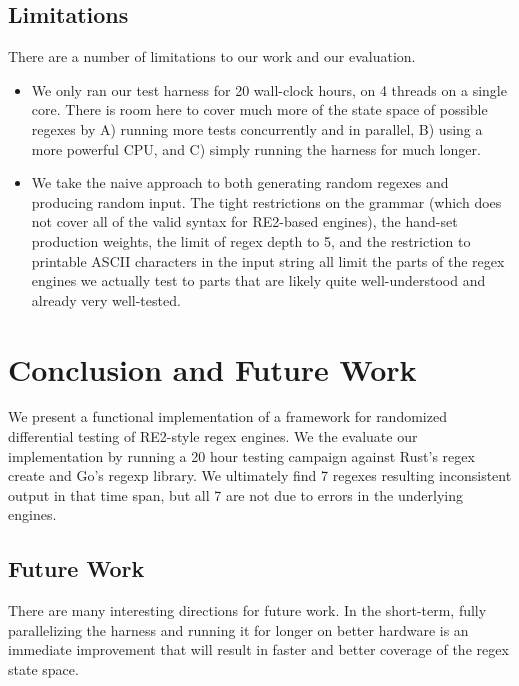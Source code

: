 \documentclass[acmsmall,nonacm,screen]{acmart}
\begin{document}
\subsection{Limitations}
There are a number of limitations to our work and our evaluation.
\begin{itemize}
\item We only ran our test harness for 20 wall-clock hours, on 4 threads on a single core. There is room here to cover much more of the state space of possible regexes by A) running more tests concurrently and in parallel, B) using a more powerful CPU, and C) simply running the harness for much longer.
\item We take the naive approach to both generating random regexes and producing random input. The tight restrictions on the grammar (which does not cover all of the valid syntax for RE2-based engines), the hand-set production weights, the limit of regex depth to 5, and the restriction to printable ASCII characters in the input string all limit the parts of the regex engines we actually test to parts that are likely quite well-understood and already very well-tested.
\end{itemize}

\section{Conclusion and Future Work}
We present a functional implementation of a framework for randomized differential testing of RE2-style regex engines. We the evaluate our implementation by running a 20 hour testing campaign against Rust's regex create and Go's regexp library. We ultimately find 7 regexes resulting inconsistent output in that time span, but all 7 are not due to errors in the underlying engines.
\subsection{Future Work}
There are many interesting directions for future work. In the short-term, fully parallelizing the harness and running it for longer on better hardware is an immediate improvement that will result in faster and better coverage of the regex state space.
\end{document}
